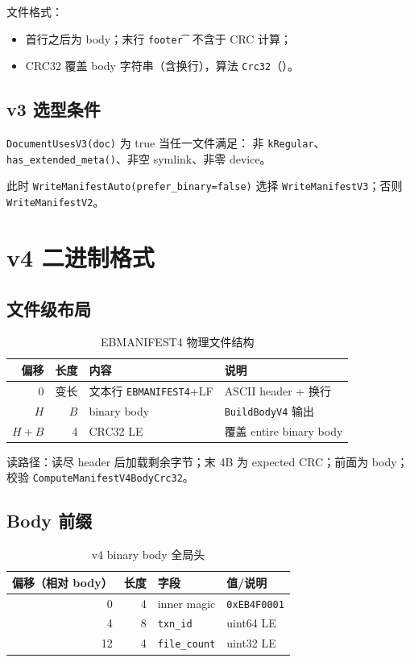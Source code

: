 文件格式：
\begin{itemize}[nosep]
  \item 首行之后为 body；末行 \texttt{footer\t<CRC32hex>} 不含于 CRC 计算；
  \item CRC32 覆盖 body 字符串（含换行），算法 \texttt{Crc32}（）。
\end{itemize}

\subsection{v3 选型条件}

\texttt{DocumentUsesV3(doc)} 为 true 当任一文件满足：
非 \texttt{kRegular}、\texttt{has\_extended\_meta()}、非空 symlink、非零 device。

此时 \texttt{WriteManifestAuto(prefer\_binary=false)} 选择 \texttt{WriteManifestV3}；否则 \texttt{WriteManifestV2}。

\section{v4 二进制格式}

\subsection{文件级布局}

\begin{longtable}{@{}rrlp{7cm}@{}}
\caption{EBMANIFEST4 物理文件结构} \\
\toprule
偏移 & 长度 & 内容 & 说明 \\
\midrule
0 & 变长 & 文本行 \texttt{EBMANIFEST4}+LF & ASCII header + 换行 \\
$H$ & $B$ & binary body & \texttt{BuildBodyV4} 输出 \\
$H+B$ & 4 & CRC32 LE & 覆盖 entire binary body \\
\bottomrule
\end{longtable}

读路径：读尽 header 后加载剩余字节；末 4B 为 expected CRC；前面为 body；校验 \texttt{ComputeManifestV4BodyCrc32}。

\subsection{Body 前缀}

\begin{longtable}{@{}rrll@{}}
\caption{v4 binary body 全局头} \\
\toprule
偏移（相对 body） & 长度 & 字段 & 值/说明 \\
\midrule
0 & 4 & inner magic & \texttt{0xEB4F0001} \\
4 & 8 & \texttt{txn\_id} & uint64 LE \\
12 & 4 & \texttt{file\_count} & uint32 LE \\
\bottomrule
\end{longtable}

